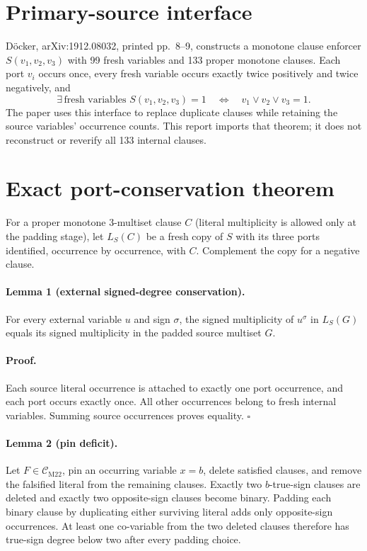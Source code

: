 \documentclass[11pt]{article}
\newcommand{\CM}{\mathcal C_{\mathrm{M22}}}
\begin{document}
\section{Primary-source interface}
D\"ocker, arXiv:1912.08032, printed pp.~8--9, constructs a monotone clause
enforcer $S(v_1,v_2,v_3)$ with 99 fresh variables and 133 proper monotone
clauses.  Each port $v_i$ occurs once, every fresh variable occurs exactly
twice positively and twice negatively, and
\[
 \exists\,\text{fresh variables }S(v_1,v_2,v_3)=1
 \quad\Longleftrightarrow\quad v_1\lor v_2\lor v_3=1.
\]
The paper uses this interface to replace duplicate clauses while retaining the
source variables' occurrence counts.  This report imports that theorem; it
does not reconstruct or reverify all 133 internal clauses.

\section{Exact port-conservation theorem}
For a proper monotone 3-multiset clause $C$ (literal multiplicity is allowed
only at the padding stage), let $L_S(C)$ be a fresh copy of $S$ with its three
ports identified, occurrence by occurrence, with $C$.  Complement the copy
for a negative clause.

\paragraph{Lemma 1 (external signed-degree conservation).}
For every external variable $u$ and sign $\sigma$, the signed multiplicity of
$u^\sigma$ in $L_S(G)$ equals its signed multiplicity in the padded source
multiset $G$.

\paragraph{Proof.}
Each source literal occurrence is attached to exactly one port occurrence, and
each port occurs exactly once.  All other occurrences belong to fresh internal
variables.  Summing source occurrences proves equality. \(\square\)

\paragraph{Lemma 2 (pin deficit).}
Let $F\in\CM$, pin an occurring variable $x=b$, delete satisfied clauses, and
remove the falsified literal from the remaining clauses.  Exactly two
$b$-true-sign clauses are deleted and exactly two opposite-sign clauses become
binary.  Padding each binary clause by duplicating either surviving literal
adds only opposite-sign occurrences.  At least one co-variable from the two
deleted clauses therefore has true-sign degree below two after every padding
choice.
\end{document}
